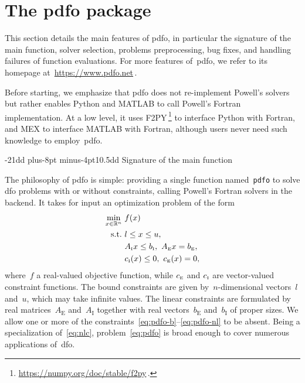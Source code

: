 \documentclass[
    smallextended,  %
    final,          %
]{svjour3}
\makeatletter
\newcommand{\R}{\mathbb{R}}
\newcommand{\aeq}{A_{\scriptscriptstyle\text{E}}}
\newcommand{\aub}{A_{\scriptscriptstyle\text{I}}}
\newcommand{\beq}{b_{\scriptscriptstyle\text{E}}}
\newcommand{\bub}{b_{\scriptscriptstyle\text{I}}}
\newcommand{\ceq}{\con[\scriptscriptstyle{\text{E}}]}
\newcommand{\con}[1][i]{c\ifthenelse{\equal{#1}{}}{}{_{#1}}}
\newcommand{\cub}{\con[\scriptscriptstyle\text{I}]}
\newcommand{\obj}{f}
\newcommand{\st}{\text{s.t.}}
\newcommand{\xl}{l}
\newcommand{\xu}{u}
\newcommand{\pdfofun}{\texttt{pdfo}\xspace}
\def\subsection{\@startsection{subsection}{2}{\z@}%
    {-21dd plus-8pt minus-4pt}{10.5dd}
     {\normalsize\bfseries}}
\makeatother
\begin{document}
\section{The \texorpdfstring{\gls{pdfo}}{PDFO} package}
\label{sec:pdfo}

This section details the main features of \gls{pdfo}, in particular the signature of the main
function, solver selection, problems preprocessing, bug fixes, and handling failures of function
evaluations. For more features of~\gls{pdfo}, we refer to its homepage
at~\url{https://www.pdfo.net}\,.

Before starting, we
emphasize that \gls{pdfo} does not re-implement Powell’s solvers but rather enables Python and MATLAB
to call Powell's Fortran implementation.
At a low level, it uses F2PY\,\footnote{\url{https://numpy.org/doc/stable/f2py}\,.} to interface Python with Fortran, and MEX to
interface MATLAB with Fortran, although users never need such knowledge to employ~\gls{pdfo}.

\subsection{Signature of the main function}

The philosophy of \gls{pdfo} is simple: providing a single function named~\pdfofun to solve
\gls{dfo} problems with or without constraints, calling Powell's Fortran solvers in the backend.
It takes for input an optimization problem of the form
\begin{subequations}
    \label{eq:pdfo}
    \begin{align}
        \min_{x \in \R^n}   & ~ \obj(x)\\
        \st                 & ~ \xl \le x \le \xu, \label{eq:pdfo-b}\\
                            & ~ \aub x \le \bub, ~ \aeq x = \beq, \label{eq:pdfo-l}\\
                            & ~ \cub(x) \le 0, ~ \ceq(x) = 0, \label{eq:pdfo-nl}
    \end{align}
\end{subequations}
where~$\obj$ a real-valued objective function, while $\ceq$ and $\cub$ are vector-valued constraint functions.
The bound constraints are given by~$n$-dimensional vectors~$\xl$ and~$\xu$, which may take infinite values. The linear constraints
are formulated by real matrices~$\aeq$ and~$\aub$ together with real vectors~$\beq$ and~$\bub$ of
proper sizes.
We allow one or more of the constraints~\eqref{eq:pdfo-b}--\eqref{eq:pdfo-nl} to be absent.
Being a specialization of~\eqref{eq:nlc}, problem~\eqref{eq:pdfo} is broad enough to
cover numerous applications of~\gls{dfo}.
\end{document}
